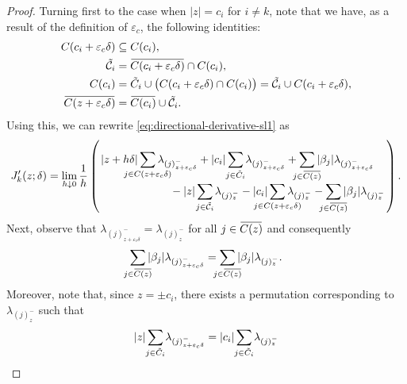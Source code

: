 \begin{proof}
  Turning first to the case when \(|z| = c_i\) for \(i \neq k\), note that we have,
  as a result of the definition of
  \({\varepsilon_c}\), the following identities:
  \begin{align*}
    C(c_i + {\varepsilon_c}\delta)          & \subseteq C(c_i),                                                                                                                     \\
    \tilde{\mathcal{C}}_i                   & = \widebar{C(c_i + {\varepsilon_c} \delta)} \cap C(c_i),                                                                              \\
    C(c_i)                                  & = \tilde{C}_i \cup \big(C(c_i + {\varepsilon_c}\delta) \cap C(c_i)\big) = \tilde{\mathcal{C}}_i \cup C(c_i + {\varepsilon_c} \delta), \\
    \widebar{C(z + {\varepsilon_c} \delta)} & = \widebar{C(c_i)} \cup \tilde{\mathcal{C}}_i.
  \end{align*}
  Using this, we can rewrite \eqref{eq:directional-derivative-sl1} as
  \begin{equation*}
    \label{eq:directional-derivative-simplified}
    J'_k(z; \delta)
    = \lim_{h \downarrow 0} \frac{1}{h}
    \left(
      \splitfrac{
      |z + h\delta|\smashoperator{\sum_{j \in C(z + {\varepsilon_c}\delta)}} \lambda_{(j)^-_{z + {\varepsilon_c}\delta}}
      + |c_i|\smashoperator{\sum_{j \in \tilde{C}_i}} \lambda_{(j)^-_{z + {\varepsilon_c}\delta}}
      + \smashoperator{\sum_{j \in \widebar{C(z)}}} |\beta_j|\lambda_{(j)^-_{z + {\varepsilon_c}\delta}}
      }{%
      - |z| \smashoperator{\sum_{j \in \tilde{\mathcal{C}}_i}} \lambda_{(j)^-_{z}}
      - |c_i| \smashoperator{\sum_{j \in C(z + {\varepsilon_c}\delta)}} \lambda_{(j)^-_{z}}
      - \smashoperator{\sum_{j \in \widebar{C(z)}}} |\beta_j| \lambda_{(j)^-_{z}}
      }
    \right).
  \end{equation*}
  Next, observe that \(\lambda_{(j)^-_{z + {\varepsilon_c}\delta}} =
  \lambda_{(j)^-_{z}}\) for all \(j \in \widebar{C(z)}\) and consequently
  \[
    \smashoperator{\sum_{j \in \widebar{C(z)}}} |\beta_j|\lambda_{(j)^-_{z + {\varepsilon_c}\delta}} =
    \smashoperator{\sum_{j \in \widebar{C(z)}}} |\beta_j|\lambda_{(j)^-_{z}}.
  \]
  Moreover, note that, since \(z = \pm c_i\), there exists a permutation corresponding to
  \(\lambda_{(j)^-_{z}}\) such that
  \[
    |z|\smashoperator{\sum_{j \in \tilde{C}_i}} \lambda_{(j)^-_{z + {\varepsilon_c}\delta}}
    = |c_i| \smashoperator{\sum_{j \in \tilde{C}_i}} \lambda_{(j)^-_{z}}
\]
\end{proof}
